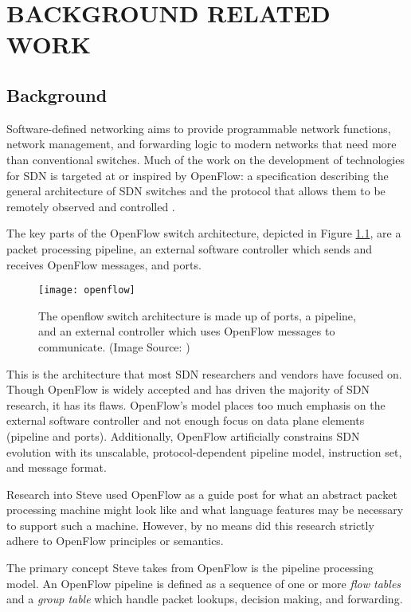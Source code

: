 \chapter{BACKGROUND RELATED WORK}
\label{ch:related}

\section{Background}
\label{rel:openflow}

Software-defined networking aims to provide programmable network functions,
network management, and forwarding logic to modern networks that need more
than conventional switches.
Much of the work on the development of technologies for SDN is targeted at or 
inspired by OpenFlow: a specification describing the general architecture of SDN 
switches and the protocol that allows them to be remotely observed and controlled 
\cite{openflow_spec}. 

The key parts of the OpenFlow switch architecture, depicted in Figure \ref{fg:openflow_switch}, are a packet 
processing pipeline, an external software controller which sends and receives
OpenFlow messages, and ports. 

\begin{figure}[ht]
\centering
\texttt{[image: openflow]}
\caption{The openflow switch architecture is made up of ports, a pipeline,
and an external controller which uses OpenFlow messages to communicate. (Image Source: \cite{openflow_spec})}
\label{fg:openflow_switch}
\end{figure}

This is the architecture that most SDN researchers and vendors have focused on.
Though OpenFlow is widely accepted and has driven the majority of SDN research,
it has its flaws.
OpenFlow's model places too much emphasis on the external software controller
and not enough focus on data plane elements (pipeline and ports).
Additionally, OpenFlow artificially constrains SDN evolution with its
unscalable, protocol-dependent pipeline model, instruction set, and message format.

Research into Steve used OpenFlow as a guide post for what an abstract
packet processing machine might look like and what language features may be
necessary to support such a machine. However, by no means did this research
strictly adhere to OpenFlow principles or semantics.

The primary concept Steve takes from OpenFlow is the pipeline processing model.
An OpenFlow pipeline is defined as a sequence
of one or more \textit{flow tables} and a \textit{group table} which handle
packet lookups, decision making, and forwarding.

